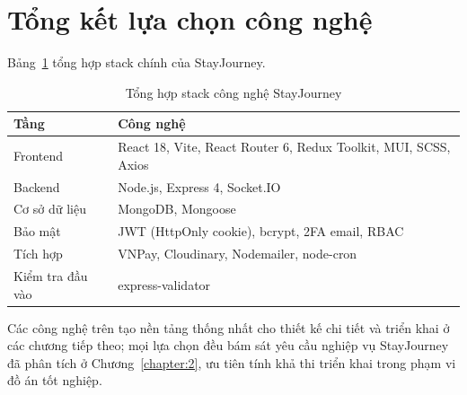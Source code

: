 \documentclass[../DoAn.tex]{subfiles}
\begin{document}
\section{Tổng kết lựa chọn công nghệ}
\label{section:3.10}

Bảng~\ref{tab:tong-hop-stack} tổng hợp stack chính của StayJourney.

\begin{table}[htbp]
\centering
\caption{Tổng hợp stack công nghệ StayJourney}
\label{tab:tong-hop-stack}
\small
\begin{tabular}{|l|l|}
\hline
\textbf{Tầng} & \textbf{Công nghệ} \\
\hline
Frontend & React 18, Vite, React Router 6, Redux Toolkit, MUI, SCSS, Axios \\
Backend & Node.js, Express 4, Socket.IO \\
Cơ sở dữ liệu & MongoDB, Mongoose \\
Bảo mật & JWT (HttpOnly cookie), bcrypt, 2FA email, RBAC \\
Tích hợp & VNPay, Cloudinary, Nodemailer, node-cron \\
Kiểm tra đầu vào & express-validator \\
\hline
\end{tabular}
\end{table}

Các công nghệ trên tạo nền tảng thống nhất cho thiết kế chi tiết và triển khai ở các chương tiếp theo; mọi lựa chọn đều bám sát yêu cầu nghiệp vụ StayJourney đã phân tích ở Chương~\ref{chapter:2}, ưu tiên tính khả thi triển khai trong phạm vi đồ án tốt nghiệp.
\end{document}

